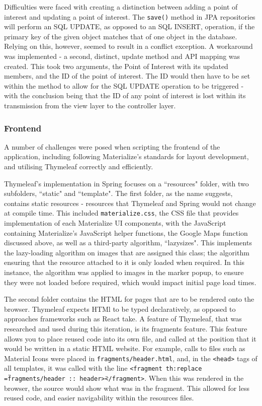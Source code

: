 Difficulties were faced with creating a distinction between adding a point of interest and updating a point of interest. The \texttt{save()} method in JPA repositories will perform an SQL UPDATE, as opposed to an SQL INSERT, operation, if the primary key of the given object matches that of one object in the database. Relying on this, however, seemed to result in a conflict exception. A workaround was implemented - a second, distinct, update method and API mapping was created. This took two arguments, the Point of Interest with its updated members, and the ID of the point of interest. The ID would then have to be set within the method to allow for the SQL UPDATE operation to be triggered - with the conclusion being that the ID of any point of interest is lost within its transmission from the view layer to the controller layer.

\subsubsection{Frontend}

A number of challenges were posed when scripting the frontend of the application, including following Materialize's standards for layout development, and utilising Thymeleaf correctly and efficiently.

Thymeleaf's implementation in Spring focuses on a ``resources" folder, with two subfolders, ``static" and ``template". The first folder, as the name suggests, contains static resources - resources that Thymeleaf and Spring would not change at compile time. This included \texttt{materialize.css}, the CSS file that provides implementation of each Materialize UI components, with the JavaScript containing Materialize's JavaScript helper functions, the Google Maps function discussed above, as well as a third-party algorithm, ``lazysizes"\cite{lazysizes}. This implements the lazy-loading algorithm on images that are assigned this class; the algorithm ensuring that the resource attached to it is only loaded when required. In this instance, the algorithm was applied to images in the marker popup, to ensure they were not loaded before required, which would impact initial page load times.

The second folder contains the HTML for pages that are to be rendered onto the browser. Thymeleaf expects HTMl to be typed declaratively, as opposed to approaches frameworks such as React take. A feature of Thymeleaf, that was researched and used during this iteration, is its fragments feature. This feature allows you to place reused code into its own file, and called at the position that it would be written in a static HTML website. For example, calls to files such as Material Icons were placed in \texttt{fragments/header.html}, and, in the \texttt{<head>} tags of all templates, it was called with the line \texttt{<fragment th:replace
=\"fragments/header :: header\"></fragment>}. When this was rendered in the browser, the source would show what was in the fragment. This allowed for less reused code, and easier navigability within the resources files.


